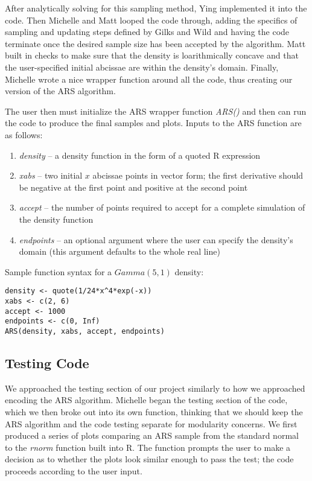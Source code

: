 \documentclass{article}
\begin{document}
After analytically solving for this sampling method, Ying implemented it into the code.  Then Michelle and Matt looped the code through, adding the specifics of sampling and updating steps defined by Gilks and Wild and having the code terminate once the desired sample size has been accepted by the algorithm.  Matt built in checks to make sure that the density is loarithmically concave and that the user-specified initial abcissae are within the density's domain.  Finally, Michelle wrote a nice wrapper function around all the code, thus creating our version of the ARS algorithm.

The user then must initialize the ARS wrapper function \textit{ARS()} and then can run the code to produce the final samples and plots. Inputs to the ARS function are as follows:
\begin{enumerate}
\item \textit{density} -- a density function in the form of a quoted R expression
\item \textit{xabs} -- two initial $x$ abcissae points in vector form; the first derivative should be negative at the first point and positive at the second point
\item \textit{accept} -- the number of points required to accept for a complete simulation of the density function
\item \textit{endpoints} -- an optional argument where the user can specify the density's domain (this argument defaults to the whole real line)
\end{enumerate}
Sample function syntax for a $Gamma\left(5,1\right)$ density:

\begin{lstlisting}
density <- quote(1/24*x^4*exp(-x))
xabs <- c(2, 6)
accept <- 1000
endpoints <- c(0, Inf)
ARS(density, xabs, accept, endpoints)
\end{lstlisting}


\subsection{Testing Code}
We approached the testing section of our project similarly to how we approached encoding the ARS algorithm.  Michelle began the testing section of the code, which we then broke out into its own function, thinking that we should keep the ARS algorithm and the code testing separate for modularity concerns.  We first produced a series of plots comparing an ARS sample from the standard normal to the \textit{rnorm} function built into R.  The function prompts the user to make a decision as to whether the plots look similar enough to pass the test; the code proceeds according to the user input.
\end{document}
